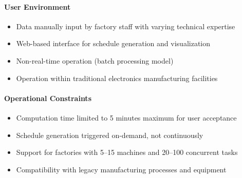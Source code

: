 \paragraph{User Environment}
\begin{itemize}
  \item Data manually input by factory staff with varying technical expertise
  \item Web-based interface for schedule generation and visualization
  \item Non-real-time operation (batch processing model)
  \item Operation within traditional electronics manufacturing facilities
\end{itemize}

\paragraph{Operational Constraints}
\begin{itemize}
  \item Computation time limited to 5 minutes maximum for user acceptance
  \item Schedule generation triggered on-demand, not continuously
  \item Support for factories with 5--15 machines and 20--100 concurrent tasks
  \item Compatibility with legacy manufacturing processes and equipment
\end{itemize}

